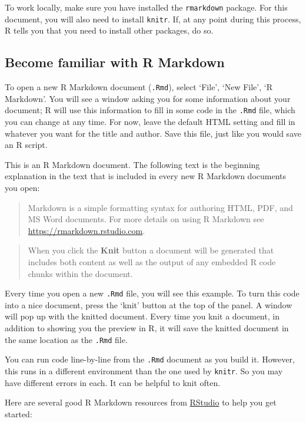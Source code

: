 \documentclass[
]{article}
\begin{document}
To work locally, make sure you have installed the \texttt{rmarkdown}
package. For this document, you will also need to install
\texttt{knitr}. If, at any point during this process, R tells you that
you need to install other packages, do so.

\hypertarget{become-familiar-with-r-markdown}{%
\subsection{Become familiar with R
Markdown}\label{become-familiar-with-r-markdown}}

To open a new R Markdown document (\texttt{.Rmd}), select `File', `New
File', `R Markdown'. You will see a window asking you for some
information about your document; R will use this information to fill in
some code in the \texttt{.Rmd} file, which you can change at any time.
For now, leave the default HTML setting and fill in whatever you want
for the title and author. Save this file, just like you would save an R
script.

This is an R Markdown document. The following text is the beginning
explanation in the text that is included in every new R Markdown
documents you open:

\begin{quote}
Markdown is a simple formatting syntax for authoring HTML, PDF, and MS
Word documents. For more details on using R Markdown see
\url{https://rmarkdown.rstudio.com}.
\end{quote}

\begin{quote}
When you click the \textbf{Knit} button a document will be generated
that includes both content as well as the output of any embedded R code
chunks within the document.
\end{quote}

Every time you open a new \texttt{.Rmd} file, you will see this example.
To turn this code into a nice document, press the `knit' button at the
top of the panel. A window will pop up with the knitted document. Every
time you knit a document, in addition to showing you the preview in R,
it will save the knitted document in the same location as the
\texttt{.Rmd} file.

You can run code line-by-line from the \texttt{.Rmd} document as you
build it. However, this runs in a different environment than the one
used by \texttt{knitr}. So you may have different errors in each. It can
be helpful to knit often.

Here are several good R Markdown resources from
\href{https://rmarkdown.rstudio.com/}{RStudio} to help you get started:
\end{document}
